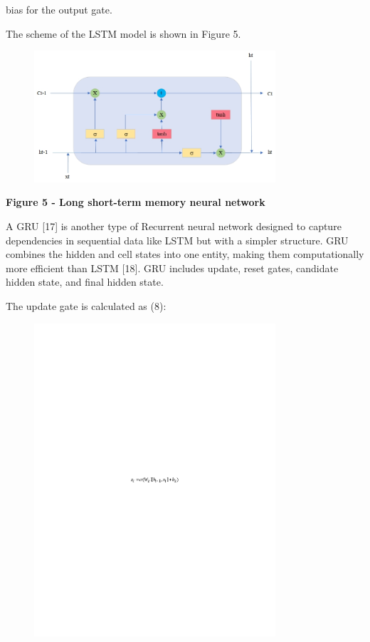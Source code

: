 bias for the output gate.

The scheme of the LSTM model is shown in Figure 5.

\begin{figure}[H]
	\centering
	\includegraphics[width=0.8\textwidth]{media/ict/image63}
	\caption*{}
\end{figure}


{\bfseries Figure 5 - Long short-term memory neural network}

A GRU {[}17{]} is another type of Recurrent neural network designed to
capture dependencies in sequential data like LSTM but with a simpler
structure. GRU combines the hidden and cell states into one entity,
making them computationally more efficient than LSTM {[}18{]}. GRU
includes update, reset gates, candidate hidden state, and final hidden
state.

The update gate is calculated as (8):

\begin{figure}[H]
	\centering
	\includegraphics[width=0.8\textwidth]{media/ict/image64}
	\caption*{}
\end{figure}


